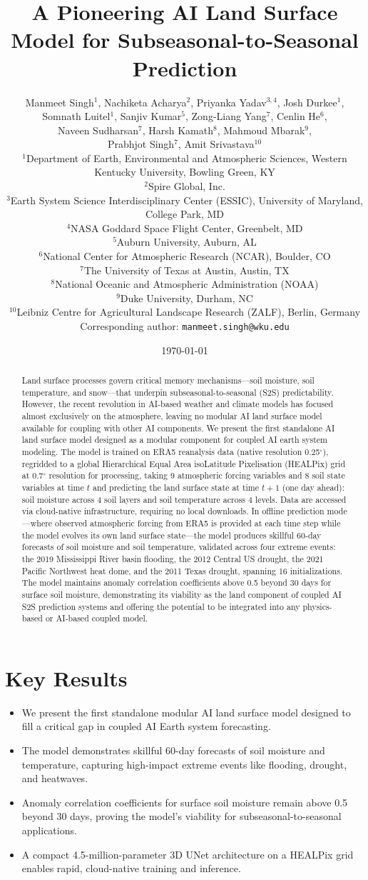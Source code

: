 \documentclass[11pt]{article}
\title{A Pioneering AI Land Surface Model for Subseasonal-to-Seasonal Prediction}
\author{\parbox{0.9\textwidth}{%
\centering
Manmeet Singh$^{1}$, Nachiketa Acharya$^{2}$, Priyanka Yadav$^{3,4}$, Josh Durkee$^{1}$, \\
Somnath Luitel$^{1}$, Sanjiv Kumar$^{5}$, Zong-Liang Yang$^{7}$, Cenlin He$^{6}$, \\
Naveen Sudharsan$^{7}$, Harsh Kamath$^{8}$, Mahmoud Mbarak$^{9}$, \\
Prabhjot Singh$^{7}$, Amit Srivastava$^{10}$
\\[12pt]
{\small
$^{1}$Department of Earth, Environmental and Atmospheric Sciences, Western Kentucky University, Bowling Green, KY \\
$^{2}$Spire Global, Inc. \\
$^{3}$Earth System Science Interdisciplinary Center (ESSIC), University of Maryland, College Park, MD \\
$^{4}$NASA Goddard Space Flight Center, Greenbelt, MD \\
$^{5}$Auburn University, Auburn, AL \\
$^{6}$National Center for Atmospheric Research (NCAR), Boulder, CO \\
$^{7}$The University of Texas at Austin, Austin, TX \\
$^{8}$National Oceanic and Atmospheric Administration (NOAA) \\
$^{9}$Duke University, Durham, NC \\
$^{10}$Leibniz Centre for Agricultural Landscape Research (ZALF), Berlin, Germany \\[8pt]
Corresponding author: \texttt{manmeet.singh@wku.edu}
}
}}
\date{\today}
\begin{document}
\maketitle

\begin{abstract}
Land surface processes govern critical memory mechanisms---soil moisture, soil temperature, and snow---that underpin subseasonal-to-seasonal (S2S) predictability. However, the recent revolution in AI-based weather and climate models has focused almost exclusively on the atmosphere, leaving no modular AI land surface model available for coupling with other AI components. We present the first standalone AI land surface model designed as a modular component for coupled AI earth system modeling. The model is trained on ERA5 reanalysis data (native resolution 0.25$^\circ$), regridded to a global Hierarchical Equal Area isoLatitude Pixelisation (HEALPix) grid at 0.7$^\circ$ resolution for processing, taking 9 atmospheric forcing variables and 8 soil state variables at time $t$ and predicting the land surface state at time $t+1$ (one day ahead): soil moisture across 4 soil layers and soil temperature across 4 levels. Data are accessed via cloud-native infrastructure, requiring no local downloads. In offline prediction mode---where observed atmospheric forcing from ERA5 is provided at each time step while the model evolves its own land surface state---the model produces skillful 60-day forecasts of soil moisture and soil temperature, validated across four extreme events: the 2019 Mississippi River basin flooding, the 2012 Central US drought, the 2021 Pacific Northwest heat dome, and the 2011 Texas drought, spanning 16 initializations. The model maintains anomaly correlation coefficients above 0.5 beyond 30 days for surface soil moisture, demonstrating its viability as the land component of coupled AI S2S prediction systems and offering the potential to be integrated into any physics-based or AI-based coupled model.
\end{abstract}

\section*{Key Results}
\begin{itemize}
    \item We present the first standalone modular AI land surface model designed to fill a critical gap in coupled AI Earth system forecasting.
    \item The model demonstrates skillful 60-day forecasts of soil moisture and temperature, capturing high-impact extreme events like flooding, drought, and heatwaves.
    \item Anomaly correlation coefficients for surface soil moisture remain above 0.5 beyond 30 days, proving the model's viability for subseasonal-to-seasonal applications.
    \item A compact 4.5-million-parameter 3D UNet architecture on a HEALPix grid enables rapid, cloud-native training and inference.
\end{itemize}
\end{document}
